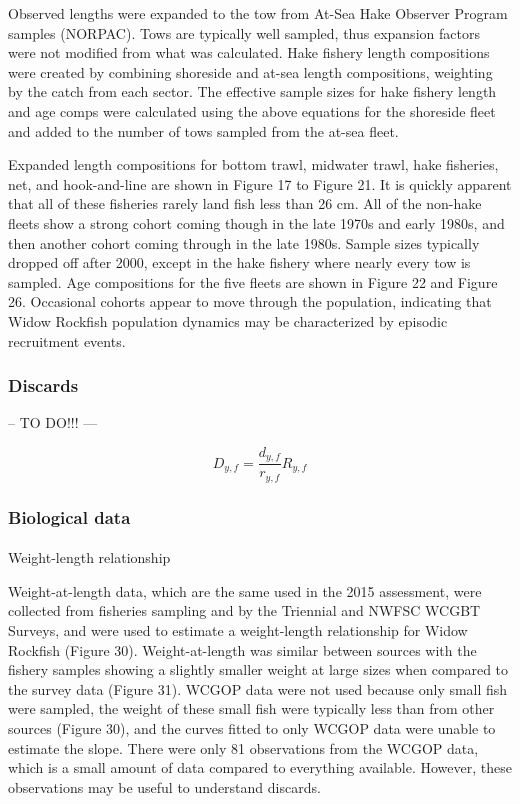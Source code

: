 \documentclass[
]{scrartcl}
\makeatletter
\let\oldparagraph\paragraph
\renewcommand{\paragraph}{
    \@ifstar
      \xxxParagraphStar
      \xxxParagraphNoStar
  }
\newcommand{\xxxParagraphStar}[1]{\oldparagraph*{#1}\mbox{}}
\newcommand{\xxxParagraphNoStar}[1]{\oldparagraph{#1}\mbox{}}
\makeatother
\begin{document}
Observed lengths were expanded to the tow from At-Sea Hake Observer
Program samples (NORPAC). Tows are typically well sampled, thus
expansion factors were not modified from what was calculated. Hake
fishery length compositions were created by combining shoreside and
at-sea length compositions, weighting by the catch from each sector. The
effective sample sizes for hake fishery length and age comps were
calculated using the above equations for the shoreside fleet and added
to the number of tows sampled from the at-sea fleet.

Expanded length compositions for bottom trawl, midwater trawl, hake
fisheries, net, and hook-and-line are shown in Figure 17 to Figure 21.
It is quickly apparent that all of these fisheries rarely land fish less
than 26 cm. All of the non-hake fleets show a strong cohort coming
though in the late 1970s and early 1980s, and then another cohort coming
through in the late 1980s. Sample sizes typically dropped off after
2000, except in the hake fishery where nearly every tow is sampled. Age
compositions for the five fleets are shown in Figure 22 and Figure 26.
Occasional cohorts appear to move through the population, indicating
that Widow Rockfish population dynamics may be characterized by episodic
recruitment events.

\subsubsection{Discards}\label{discards}

-- TO DO!!! ---

\[
D_{y,f} = \frac{d_{y,f}}{r_{y,f}} R_{y,f}
\]

\subsubsection{Biological data}\label{biological-data}

\paragraph{Weight-length relationship}\label{weight-length-relationship}

Weight-at-length data, which are the same used in the 2015 assessment,
were collected from fisheries sampling and by the Triennial and NWFSC
WCGBT Surveys, and were used to estimate a weight-length relationship
for Widow Rockfish (Figure 30). Weight-at-length was similar between
sources with the fishery samples showing a slightly smaller weight at
large sizes when compared to the survey data (Figure 31). WCGOP data
were not used because only small fish were sampled, the weight of these
small fish were typically less than from other sources (Figure 30), and
the curves fitted to only WCGOP data were unable to estimate the slope.
There were only 81 observations from the WCGOP data, which is a small
amount of data compared to everything available. However, these
observations may be useful to understand discards.
\end{document}
